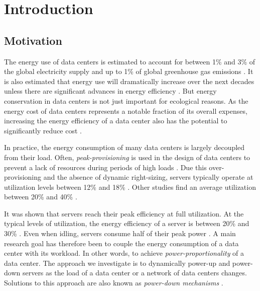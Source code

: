 
\chapter{Introduction}\label{chapter:introduction}

\section{Motivation}

The energy use of data centers is estimated to account for between 1\% and 3\% of the global electricity supply and up to 1\% of global greenhouse gas emissions \cite{Shehabi2016, Jones2018, Bashroush2020, Masanet2020}. It is also estimated that energy use will dramatically increase over the next decades unless there are significant advances in energy efficiency \cite{Jones2018}. But energy conservation in data centers is not just important for ecological reasons. As the energy cost of data centers represents a notable fraction of its overall expenses, increasing the energy efficiency of a data center also has the potential to significantly reduce cost \cite{Barroso2007, Brill2007, Hamilton2008}.

In practice, the energy consumption of many data centers is largely decoupled from their load. Often, \textit{peak-provisioning} is used in the design of data centers to prevent a lack of resources during periods of high loads \cite{Whitney2014}. Due this over-provisioning and the absence of dynamic right-sizing, servers typically operate at utilization levels between 12\% and 18\% \cite{Whitney2014}. Other studies find an average utilization between 20\% and 40\% \cite{Barroso2007, Armbrust2010}.

It was shown that servers reach their peak efficiency at full utilization. At the typical levels of utilization, the energy efficiency of a server is between 20\% and 30\% \cite{Barroso2007}. Even when idling, servers consume half of their peak power \cite{Barroso2007}. A main research goal has therefore been to couple the energy consumption of a data center with its workload. In other words, to achieve \textit{power-proportionality} of a data center. The approach we investigate is to dynamically power-up and power-down servers as the load of a data center or a network of data centers changes. Solutions to this approach are also known as \textit{power-down mechanisms} \cite{Jin2016}.

